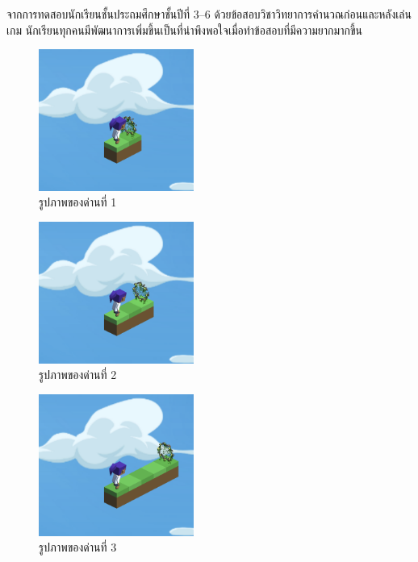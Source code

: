 จากการทดสอบนักเรียนชั้นประถมศึกษาชั้นปีที่ 3--6 ด้วยข้อสอบวิชาวิทยาการคำนวณก่อนและหลังเล่นเกม นักเรียนทุกคนมีพัฒนาการเพิ่มขึ้นเป็นที่น่าพึงพอใจเมื่อทำข้อสอบที่มีความยากมากขึ้น
\pagebreak
\begin{figure}[H]
    \begin{center}
    \includegraphics[width=2in]{pic-toro/stage/s1.png}
    \end{center}
    \caption[รูปภาพของด่านที่ 1]{รูปภาพของด่านที่ 1}
    \label{s1}
\end{figure}
\begin{figure}[H]
    \begin{center}
    \includegraphics[width=2in]{pic-toro/stage/s2.png}
    \end{center}
    \caption[รูปภาพของด่านที่ 2]{รูปภาพของด่านที่ 2}
    \label{s2}
\end{figure}
\begin{figure}[H]
    \begin{center}
    \includegraphics[width=2in]{pic-toro/stage/s3.png}
    \end{center}
    \caption[รูปภาพของด่านที่ 3]{รูปภาพของด่านที่ 3}
    \label{s3}
\end{figure}
